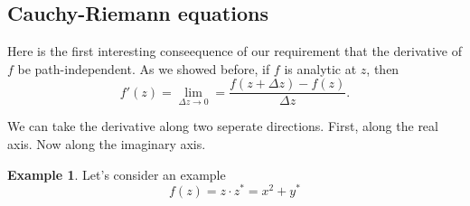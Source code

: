 \documentclass[12pt]{article}
\theoremstyle{definition}
\newtheorem{exmp}[thm]{Example}
\theoremstyle{remark}
\numberwithin{equation}{section}
\begin{document}

\subsection{Cauchy-Riemann equations}%
\label{sub:cauchy_riemann_equations}

Here is the first interesting conseequence of our requirement that the derivative of $f$ be path-independent. As we showed before, if $f$ is analytic at $z$, then
\begin{equation}
  f'(z) = \lim_{\Delta z \to 0} = \frac{f(z + \Delta z) - f(z)}{\Delta z}.
\end{equation}

We can take the derivative along two seperate directions. First, along the real axis. Now along the imaginary axis.


\begin{exmp}
Let's consider an example
\begin{equation}
  f(z) = z \cdot z^* = x^2 + y^*
\end{equation}



\end{exmp}
\end{document}
